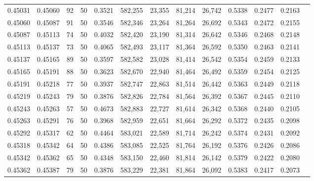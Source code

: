 \begin{tabular}{rrrrrrrrrrrrr}
0.45031 & 0.45060 &    92 &  50 &                                     0.3521 & 582,255 &  23,355 &  81,214 &  26,742 & 0.5338 & 0.2477 & 0.2163 \\
0.45060 & 0.45087 &    91 &  50 &                                     0.3546 & 582,346 &  23,264 &  81,264 &  26,692 & 0.5343 & 0.2472 & 0.2155 \\
0.45087 & 0.45113 &    74 &  50 &                                     0.4032 & 582,420 &  23,190 &  81,314 &  26,642 & 0.5346 & 0.2468 & 0.2148 \\
0.45113 & 0.45137 &    73 &  50 &                                     0.4065 & 582,493 &  23,117 &  81,364 &  26,592 & 0.5350 & 0.2463 & 0.2141 \\
0.45137 & 0.45165 &    89 &  50 &                                     0.3597 & 582,582 &  23,028 &  81,414 &  26,542 & 0.5354 & 0.2459 & 0.2133 \\
0.45165 & 0.45191 &    88 &  50 &                                     0.3623 & 582,670 &  22,940 &  81,464 &  26,492 & 0.5359 & 0.2454 & 0.2125 \\
0.45191 & 0.45218 &    77 &  50 &                                     0.3937 & 582,747 &  22,863 &  81,514 &  26,442 & 0.5363 & 0.2449 & 0.2118 \\
0.45219 & 0.45243 &    79 &  50 &                                     0.3876 & 582,826 &  22,784 &  81,564 &  26,392 & 0.5367 & 0.2445 & 0.2110 \\
0.45243 & 0.45263 &    57 &  50 &                                     0.4673 & 582,883 &  22,727 &  81,614 &  26,342 & 0.5368 & 0.2440 & 0.2105 \\
0.45263 & 0.45291 &    76 &  50 &                                     0.3968 & 582,959 &  22,651 &  81,664 &  26,292 & 0.5372 & 0.2435 & 0.2098 \\
0.45292 & 0.45317 &    62 &  50 &                                     0.4464 & 583,021 &  22,589 &  81,714 &  26,242 & 0.5374 & 0.2431 & 0.2092 \\
0.45318 & 0.45342 &    64 &  50 &                                     0.4386 & 583,085 &  22,525 &  81,764 &  26,192 & 0.5376 & 0.2426 & 0.2086 \\
0.45342 & 0.45362 &    65 &  50 &                                     0.4348 & 583,150 &  22,460 &  81,814 &  26,142 & 0.5379 & 0.2422 & 0.2080 \\
0.45362 & 0.45387 &    79 &  50 &                                     0.3876 & 583,229 &  22,381 &  81,864 &  26,092 & 0.5383 & 0.2417 & 0.2073 \\

\end{tabular}
